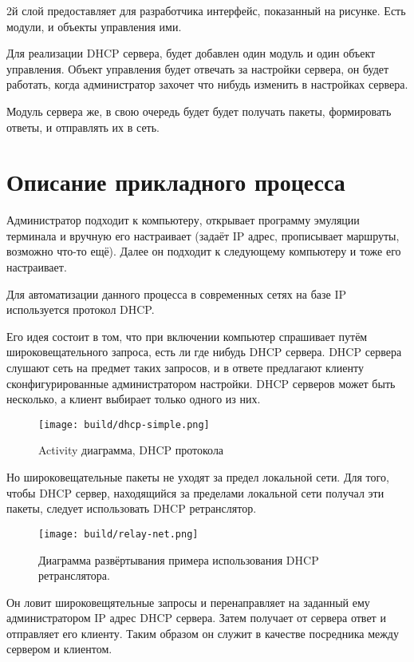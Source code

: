 \documentclass[14pt,a4paper]{extarticle}
\begin{document}
2й слой предоставляет для разработчика интерфейс, показанный на рисунке.
Есть модули, и объекты управления ими. \cite{md-docs}

Для реализации DHCP сервера, будет добавлен один модуль и один объект управления.
Объект управления будет отвечать за настройки сервера, он будет работать, когда администратор захочет что нибудь изменить в настройках сервера.

Модуль сервера же, в свою очередь будет будет получать пакеты, формировать ответы, и отправлять их в сеть.

\section{Описание прикладного процесса}

Администратор подходит к компьютеру, открывает программу эмуляции терминала и вручную его настраивает
(задаёт IP адрес, прописывает маршруты, возможно что-то ещё).
Далее он подходит к следующему компьютеру и тоже его настраивает.

Для автоматизации данного процесса в современных сетях на базе IP используется протокол DHCP.

Его идея состоит в том, что при включении компьютер спрашивает путём широковещательного запроса, есть ли где нибудь DHCP сервера.
DHCP сервера слушают сеть на предмет таких запросов, и в ответе предлагают клиенту сконфигурированные администратором настройки.
DHCP серверов может быть несколько, а клиент выбирает только одного из них.

\begin{figure}[H]
    \centering
    \texttt{[image: build/dhcp-simple.png]}
    \caption{Activity диаграмма, DHCP протокола}
\end{figure}

Но широковещательные пакеты не уходят за предел локальной сети.
Для того, чтобы DHCP сервер, находящийся за пределами локальной сети получал эти пакеты, следует использовать DHCP ретранслятор. \cite{rfc2131}

\begin{figure}[H]
    \centering
    \texttt{[image: build/relay-net.png]}
    \caption{Диаграмма развёртывания примера использования DHCP ретранслятора.}
\end{figure}

Он ловит широковещятельные запросы и перенаправляет на заданный ему администратором IP адрес DHCP сервера.
Затем получает от сервера ответ и отправляет его клиенту.
Таким образом он служит в качестве посредника между сервером и клиентом. \cite{rfc2131}
\end{document}
